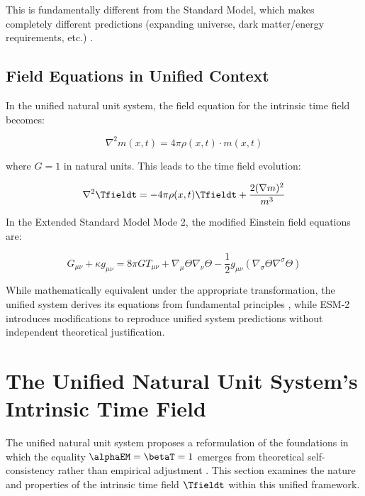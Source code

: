 	This is fundamentally different from the Standard Model, which makes completely different predictions (expanding universe, dark matter/energy requirements, etc.) \cite{Riess1998,McGaugh2016}.
	
	\subsection{Field Equations in Unified Context}
	\label{subsec:field_equations_unified}
	
	In the unified natural unit system, the field equation for the intrinsic time field becomes:
	
	\begin{equation}
		\nabla^2 m(x,t) = 4\pi \rho(x,t) \cdot m(x,t)
	\end{equation}
	
	where $G = 1$ in natural units. This leads to the time field evolution:
	
	\begin{equation}
		\nabla^2 \Tfieldt = -4\pi\rho(x,t) \Tfieldt + \frac{2(\nabla m)^2}{m^3}
	\end{equation}
	
	In the Extended Standard Model Mode 2, the modified Einstein field equations are:
	
	\begin{equation}
		G_{\mu\nu} + \kappa g_{\mu\nu} = 8\pi G T_{\mu\nu} + \nabla_{\mu}\Theta\nabla_{\nu}\Theta - \frac{1}{2}g_{\mu\nu}(\nabla_{\sigma}\Theta\nabla^{\sigma}\Theta)
	\end{equation}
	
	While mathematically equivalent under the appropriate transformation, the unified system derives its equations from fundamental principles \cite{pascher_lagrangian_2025}, while ESM-2 introduces modifications to reproduce unified system predictions without independent theoretical justification.
	
	\section{The Unified Natural Unit System's Intrinsic Time Field}
	\label{sec:unified_time_field}
	
	The unified natural unit system proposes a reformulation of the foundations in which the equality $\alphaEM = \betaT = 1$ emerges from theoretical self-consistency rather than empirical adjustment \cite{pascher_unified_2025}. This section examines the nature and properties of the intrinsic time field $\Tfieldt$ within this unified framework.
	
